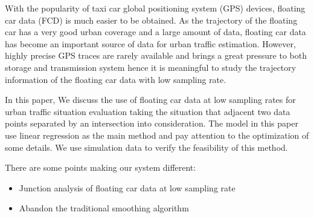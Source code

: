 
\begin{eabstract}
With the popularity of taxi car global positioning system (GPS) devices, floating car data (FCD) is much easier to be obtained. As the trajectory of the floating car has a very good urban coverage and a large amount of data, floating car data has become an important source of data for urban traffic estimation. However, highly precise GPS traces are rarely available and brings a great pressure to both storage and transmission system hence it is meaningful to study the trajectory information of the floating car data with low sampling rate.

In this paper, We discuss the use of floating car data at low sampling rates for urban traffic situation evaluation taking the situation that adjacent two data points separated by an intersection into consideration. The model in this paper use linear regression as the main method and pay attention to the optimization of some details. We use simulation data to verify the feasibility of this method.

There are some points making our system different:
   \begin{itemize}
       \item Junction analysis of floating car data at low sampling rate
       \item Abandon the traditional smoothing algorithm
   \end{itemize}
   
\end{eabstract}

